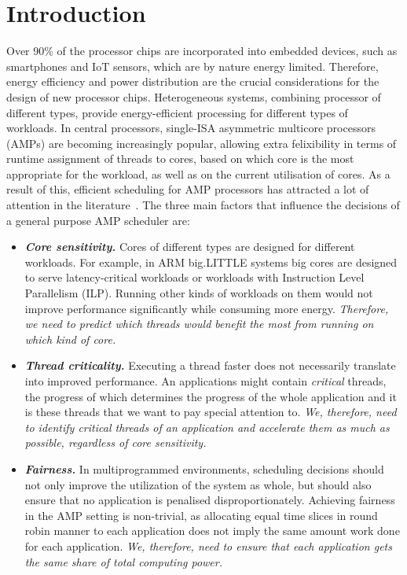 \section{Introduction}
\label{itr}


\noindent
Over 90\% of the processor chips are incorporated into embedded devices, such as smartphones and IoT sensors, which are by nature energy limited. Therefore, energy efficiency and power distribution are the crucial considerations for the design of new processor chips. Heterogeneous systems, combining processor of different types, provide energy-efficient processing for different types of workloads. In central processors, single-ISA asymmetric multicore processors (AMPs) are becoming increasingly popular, allowing extra felixibility in terms of runtime assignment of threads to cores, based on which core is the most appropriate for the workload, as well as on the current utilisation of cores. As a result of this, efficient scheduling for AMP processors has attracted a lot of attention in the literature~\cite{mittal2016survey}. The three main factors that influence the decisions of a general purpose AMP scheduler are:

\begin{itemize}
\item \textbf{\textit{Core sensitivity.}} Cores of different types are designed for different workloads. For example, in ARM big.LITTLE systems big cores are designed to serve latency-critical workloads or workloads with Instruction Level Parallelism (ILP). Running other kinds of workloads on them would not improve performance significantly while consuming more energy. \emph{Therefore, we need to predict which threads would benefit the most from running on which kind of core.}
 
\item  \textbf{\textit{Thread criticality.}} Executing a thread faster does not necessarily translate into improved performance. An applications might contain \emph{critical} threads, the progress of which determines the progress of the whole application and it is these threads that we want to pay special attention to. \emph{We, therefore, need to identify critical threads of an application and accelerate them as much as possible, regardless of core sensitivity.}

\item  \textbf{\textit{Fairness.}} In multiprogrammed environments, scheduling decisions should not only improve the utilization of the system as whole, but should also ensure that no application is penalised disproportionately. Achieving fairness in the AMP setting is non-trivial, as allocating equal time slices in round robin manner to each application does not imply the same amount work done for each application. \emph{We, therefore, need to ensure that each application gets the same share of total computing power.}
\end{itemize}

